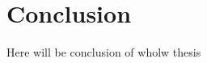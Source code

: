 \chapter*{Conclusion}\label{chap:conclusion}
\pagestyle{plain}

Here will be conclusion of wholw thesis
